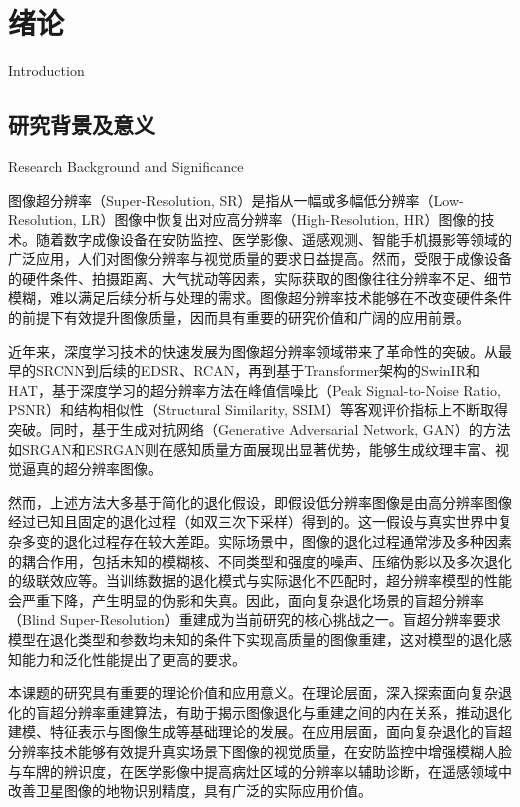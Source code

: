 \chapter{绪论}{Introduction}
\label{chap:intro}

\section{研究背景及意义}{Research Background and Significance}

图像超分辨率（Super-Resolution, SR）是指从一幅或多幅低分辨率（Low-Resolution, LR）图像中恢复出对应高分辨率（High-Resolution, HR）图像的技术。随着数字成像设备在安防监控、医学影像、遥感观测、智能手机摄影等领域的广泛应用，人们对图像分辨率与视觉质量的要求日益提高。然而，受限于成像设备的硬件条件、拍摄距离、大气扰动等因素，实际获取的图像往往分辨率不足、细节模糊，难以满足后续分析与处理的需求。图像超分辨率技术能够在不改变硬件条件的前提下有效提升图像质量，因而具有重要的研究价值和广阔的应用前景。

近年来，深度学习技术的快速发展为图像超分辨率领域带来了革命性的突破。从最早的SRCNN\cite{dong2014learning}到后续的EDSR\cite{lim2017enhanced}、RCAN\cite{zhang2018image}，再到基于Transformer架构的SwinIR\cite{liang2021swinir}和HAT\cite{chen2023activating}，基于深度学习的超分辨率方法在峰值信噪比（Peak Signal-to-Noise Ratio, PSNR）和结构相似性（Structural Similarity, SSIM）等客观评价指标上不断取得突破。同时，基于生成对抗网络（Generative Adversarial Network, GAN）的方法如SRGAN\cite{ledig2017photo}和ESRGAN\cite{wang2018esrgan}则在感知质量方面展现出显著优势，能够生成纹理丰富、视觉逼真的超分辨率图像。

然而，上述方法大多基于简化的退化假设，即假设低分辨率图像是由高分辨率图像经过已知且固定的退化过程（如双三次下采样）得到的。这一假设与真实世界中复杂多变的退化过程存在较大差距。实际场景中，图像的退化过程通常涉及多种因素的耦合作用，包括未知的模糊核、不同类型和强度的噪声、压缩伪影以及多次退化的级联效应等。当训练数据的退化模式与实际退化不匹配时，超分辨率模型的性能会严重下降，产生明显的伪影和失真。因此，面向复杂退化场景的盲超分辨率（Blind Super-Resolution）重建成为当前研究的核心挑战之一。盲超分辨率要求模型在退化类型和参数均未知的条件下实现高质量的图像重建，这对模型的退化感知能力和泛化性能提出了更高的要求。

本课题的研究具有重要的理论价值和应用意义。在理论层面，深入探索面向复杂退化的盲超分辨率重建算法，有助于揭示图像退化与重建之间的内在关系，推动退化建模、特征表示与图像生成等基础理论的发展。在应用层面，面向复杂退化的盲超分辨率技术能够有效提升真实场景下图像的视觉质量，在安防监控中增强模糊人脸与车牌的辨识度，在医学影像中提高病灶区域的分辨率以辅助诊断，在遥感领域中改善卫星图像的地物识别精度，具有广泛的实际应用价值。

